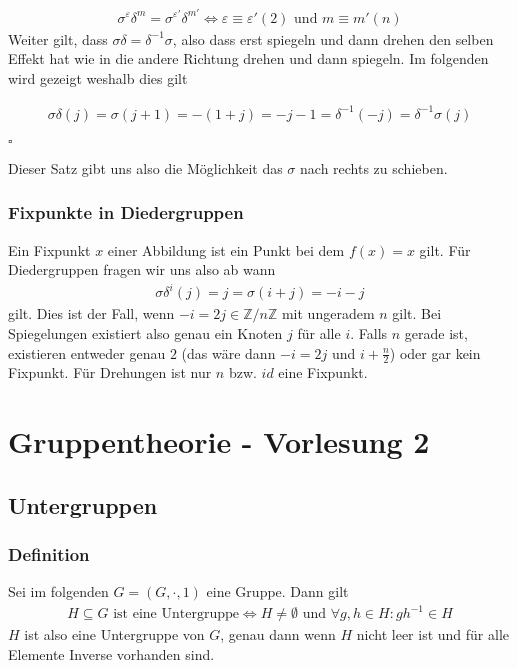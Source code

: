 \documentclass[12pt, german]{article}
\newcommand{\bewiesen}{

\begin{flushright}
		$\square$  \\
\end{flushright}}
\begin{document}
		\begin{align*}
			\sigma^\varepsilon\delta^m = \sigma^{\varepsilon'}\delta^{m'} \iff \varepsilon \equiv \varepsilon' (2) \text{ und } m \equiv m' (n)
		\end{align*}
		Weiter gilt, dass $\sigma\delta = \delta^{-1}\sigma$, also dass erst spiegeln und dann drehen den selben Effekt hat wie in die andere Richtung drehen und dann spiegeln. Im folgenden wird gezeigt weshalb dies gilt
		
		\begin{align*}
			\sigma \delta(j) = \sigma(j+1) = -(1 + j) = -j -1 = \delta^{-1}(-j)=\delta^{-1}\sigma(j)
		\end{align*}
		\bewiesen
		Dieser Satz gibt uns also die Möglichkeit das $\sigma$ nach rechts zu schieben.
		
\subsubsection{Fixpunkte in Diedergruppen}
		Ein Fixpunkt $x$ einer Abbildung ist ein Punkt bei dem $f(x) = x$ gilt. Für Diedergruppen fragen wir uns also ab wann 
		\begin{align*}
			\sigma\delta^i(j) = j = \sigma(i+j) = -i -j
		\end{align*} gilt. 
		Dies ist der Fall, wenn $-i = 2j \in \mathbb Z /n \mathbb Z$ mit ungeradem $n$ gilt. Bei Spiegelungen existiert also genau ein Knoten $j$ für alle $i$. Falls $n$ gerade ist, existieren entweder genau $2$ (das wäre dann $-i = 2j$ und $ i + \frac{n}{2}$) oder gar kein Fixpunkt. Für Drehungen ist nur $n$ bzw. $id$ eine Fixpunkt. 
		
		
\section{Gruppentheorie - Vorlesung 2}
\subsection{Untergruppen}
\subsubsection{Definition}
		Sei im folgenden $G=(G, \cdot, 1)$ eine Gruppe. Dann gilt 
		\begin{align*}
			H \subseteq G \text{ ist eine Untergruppe} \iff H \not = \emptyset \text{ und } \forall g, h \in H : gh^{-1} \in H
		\end{align*}
		$H$ ist also eine Untergruppe von $G$, genau dann wenn $H$ nicht leer ist und für alle Elemente Inverse vorhanden sind.  
\end{document}
